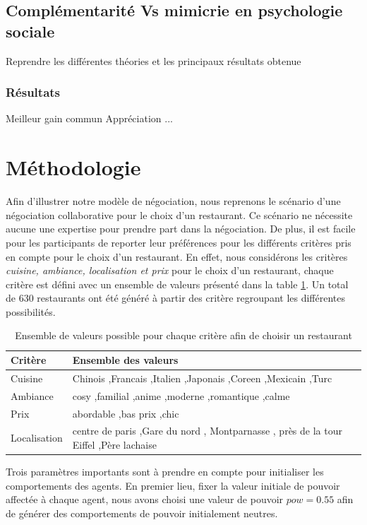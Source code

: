 \subsection{Complémentarité Vs mimicrie en psychologie sociale}
	Reprendre les différentes théories et les principaux résultats obtenue
	
	\subsubsection{Résultats}
		Meilleur gain commun
		Appréciation
		... 
		
\section{Méthodologie}
\label{sec:methodo}

	Afin d'illustrer notre modèle de négociation, nous reprenons le scénario d'une négociation collaborative pour le choix d'un restaurant.
	Ce scénario ne nécessite aucune une expertise pour prendre part dans la négociation. De plus, il est facile pour les participants de reporter leur préférences pour les différents critères pris en compte pour le choix d'un restaurant. En effet, nous considérons les critères \textit{cuisine, ambiance, localisation et prix} pour le choix d'un restaurant, chaque critère est défini avec un ensemble de valeurs présenté dans la table \ref{tab:valeursCritere}. Un total de 630 restaurants ont été généré à partir des critère regroupant les différentes possibilités.
	
	\begin{table}[b]
		\caption{Ensemble de valeurs possible pour chaque critère afin de choisir un restaurant}
		\label{tab:valeursCritere}
		\begin{tabular}{|p{2cm}|p{10.5cm}|}
			\hline
			Critère & Ensemble des valeurs \\
			\hline
			Cuisine & Chinois ,Francais ,Italien ,Japonais ,Coreen ,Mexicain ,Turc \\
			\hline
			Ambiance & cosy ,familial ,anime ,moderne ,romantique ,calme \\
			\hline 
			Prix  & abordable ,bas prix ,chic \\
			\hline
			Localisation & centre de paris ,Gare du nord , Montparnasse , près de la tour Eiffel ,Père lachaise \\
			\hline
		\end{tabular}
	\end{table}
	Trois paramètres importants sont à prendre en compte pour initialiser les comportements des agents. 
	En premier lieu, fixer la valeur initiale de pouvoir affectée à chaque agent, nous avons choisi une valeur de pouvoir $pow =0.55$ afin de générer des comportements de pouvoir initialement neutres.
	
